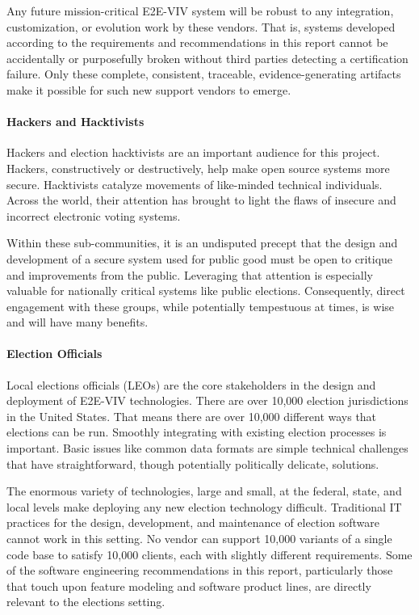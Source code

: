 Any future mission-critical E2E-VIV system will be robust to any
integration, customization, or evolution work by these vendors. That
is, systems developed according to the requirements and
recommendations in this report cannot be accidentally or purposefully
broken without third parties detecting a certification failure. Only
these complete, consistent, traceable, evidence-generating artifacts
make it possible for such new support vendors to emerge.

\paragraph{Hackers and Hacktivists} 
Hackers and election hacktivists are an important audience for this
project. Hackers, constructively or destructively, help make open
source systems more secure. Hacktivists catalyze movements of
like-minded technical individuals. Across the world, their attention
has brought to light the flaws of insecure and incorrect electronic
voting systems.

Within these sub-communities, it is an undisputed precept that the
design and development of a secure system used for public good must be
open to critique and improvements from the public. Leveraging that
attention is especially valuable for nationally critical systems like
public elections. Consequently, direct engagement with these groups,
while potentially tempestuous at times, is wise and will have many
benefits.

\paragraph{Election Officials} 
Local elections officials (LEOs) are the core stakeholders in the
design and deployment of E2E-VIV technologies. There are over 10,000
election jurisdictions in the United States. That means there are over
10,000 different ways that elections can be run. Smoothly integrating
with existing election processes is important. Basic issues like
common data formats are simple technical challenges that have
straightforward, though potentially politically delicate, solutions.

The enormous variety of technologies, large and small, at the federal,
state, and local levels make deploying any new election technology
difficult. Traditional IT practices for the design, development, and
maintenance of election software cannot work in this setting. No
vendor can support 10,000 variants of a single code base to satisfy
10,000 clients, each with slightly different requirements. Some of the
software engineering recommendations in this report, particularly
those that touch upon feature modeling and software product lines, are
directly relevant to the elections setting.

